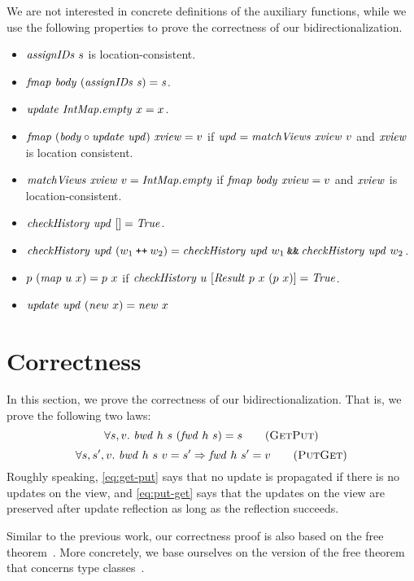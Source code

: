 \documentclass{article}
\theoremstyle{definition}
\newcommand{\APPEND}{\mathbin{\texttt{++}}}
\begin{document}
We are not interested in concrete definitions of the auxiliary functions, while
we use the following properties to prove the correctness of our 
bidirectionalization.
\begin{itemize}
 \item $\mathit{assignIDs}~s$ is location-consistent.
 \item $\mathit{fmap}~\mathit{body}~(\mathit{assignIDs}~\mathit{s}) = \mathit{s}$.
 \item $\mathit{update}~\mathit{IntMap.empty}~x = x$. %
 \item $\mathit{fmap}~(\mathit{body} \circ \mathit{update}~\mathit{upd})~\mathit{xview} = v$
    if $\mathit{upd} = \mathit{matchViews}~\mathit{xview}~v$ and $\mathit{xview}$ is location consistent.
 \item  
     $\mathit{matchViews}~\mathit{xview}~v = \mathit{IntMap.empty}$
   if $\mathit{fmap}~\mathit{body}~\mathit{xview} = v$ and $\mathit{xview}$ is location-consistent. 
 \item $\mathit{checkHistory}~\mathit{upd}~[] = \mathit{True}$.
 \item $\mi{checkHistory}~\mi{upd}~(w_1 \APPEND w_2) = \mi{checkHistory}~\mi{upd}~w_1 \mathbin{\texttt{\&\&}} \mi{checkHistory}~\mi{upd}~w_2$.
 \item $p~(\mathit{map}~u~x) = p~x$
    if $\mathit{checkHistory}~u~[\mathit{Result}~p~x~(p~x)] = \mathit{True}$.
 \item $\mathit{update}~\mathit{upd}~(\mathit{new}~x) = \mathit{new}~x$
\end{itemize}


\section{Correctness}
In this section, we prove the correctness of our bidirectionalization.
That is, we prove the following two laws:
\[
  \forall s,v.~ \mi{bwd}~h~s~(\mi{fwd}~h~s) = s \tag{\textsc{GetPut}}
  \label{eq:get-put}
\]
\[
\forall s,s',v.~ \mi{bwd}~h~s~v = s' \Rightarrow \mi{fwd}~h~s' = v \tag{\textsc{PutGet}}
 \label{eq:put-get}
\]
Roughly speaking, \ref{eq:get-put} says that no update is propagated if there is no updates on the view, and \ref{eq:put-get} says that the updates on the view are preserved after update reflection as long as the reflection succeeds. 


Similar to the previous work, our correctness proof is also based on the free theorem~\cite{Wadler89}. More concretely, we base ourselves on the version of the free theorem that concerns type classes~\cite{Voigtlander09ft}.
\end{document}
